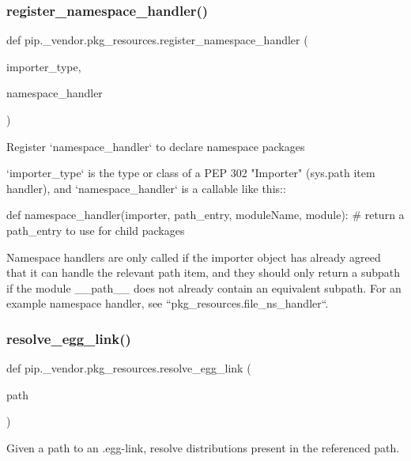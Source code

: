 \subsubsection{\texorpdfstring{register\+\_\+namespace\+\_\+handler()}{register\_namespace\_handler()}}
{\footnotesize\ttfamily def pip.\+\_\+vendor.\+pkg\+\_\+resources.\+register\+\_\+namespace\+\_\+handler (\begin{DoxyParamCaption}\item[{}]{importer\+\_\+type,  }\item[{}]{namespace\+\_\+handler }\end{DoxyParamCaption})}

\begin{DoxyVerb}Register `namespace_handler` to declare namespace packages

`importer_type` is the type or class of a PEP 302 "Importer" (sys.path item
handler), and `namespace_handler` is a callable like this::

    def namespace_handler(importer, path_entry, moduleName, module):
        # return a path_entry to use for child packages

Namespace handlers are only called if the importer object has already
agreed that it can handle the relevant path item, and they should only
return a subpath if the module __path__ does not already contain an
equivalent subpath.  For an example namespace handler, see
``pkg_resources.file_ns_handler``.
\end{DoxyVerb}
 \mbox{\label{namespacepip_1_1__vendor_1_1pkg__resources_a6788447ac6b0b1b785fe2c7dbd0dd45b}} 
\subsubsection{\texorpdfstring{resolve\+\_\+egg\+\_\+link()}{resolve\_egg\_link()}}
{\footnotesize\ttfamily def pip.\+\_\+vendor.\+pkg\+\_\+resources.\+resolve\+\_\+egg\+\_\+link (\begin{DoxyParamCaption}\item[{}]{path }\end{DoxyParamCaption})}

\begin{DoxyVerb}Given a path to an .egg-link, resolve distributions
present in the referenced path.
\end{DoxyVerb}
 \mbox{\label{namespacepip_1_1__vendor_1_1pkg__resources_a96e7a55f46096d50d6783754f8922f2a}} 
